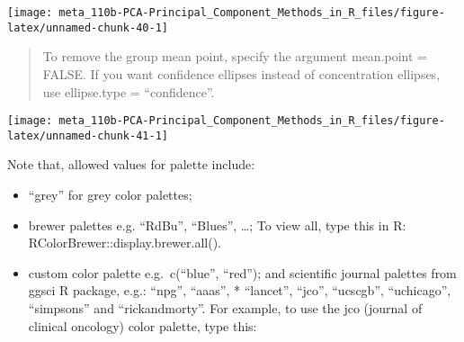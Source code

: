 \documentclass[]{book}
\newenvironment{Shaded}{\begin{snugshade}}{\end{snugshade}}
\newcommand{\CommentTok}[1]{\textcolor[rgb]{0.56,0.35,0.01}{\textit{#1}}}
\newcommand{\DataTypeTok}[1]{\textcolor[rgb]{0.13,0.29,0.53}{#1}}
\newcommand{\KeywordTok}[1]{\textcolor[rgb]{0.13,0.29,0.53}{\textbf{#1}}}
\newcommand{\NormalTok}[1]{#1}
\newcommand{\OperatorTok}[1]{\textcolor[rgb]{0.81,0.36,0.00}{\textbf{#1}}}
\newcommand{\OtherTok}[1]{\textcolor[rgb]{0.56,0.35,0.01}{#1}}
\newcommand{\StringTok}[1]{\textcolor[rgb]{0.31,0.60,0.02}{#1}}
\providecommand{\tightlist}{%
  \setlength{\itemsep}{0pt}\setlength{\parskip}{0pt}}
\begin{document}
\begin{center}\texttt{[image: meta\_110b-PCA-Principal\_Component\_Methods\_in\_R\_files/figure-latex/unnamed-chunk-40-1]} \end{center}

\begin{quote}
To remove the group mean point, specify the argument mean.point = FALSE.
If you want confidence ellipses instead of concentration ellipses, use ellipse.type = ``confidence''.
\end{quote}

\begin{Shaded}
\end{Shaded}

\begin{center}\texttt{[image: meta\_110b-PCA-Principal\_Component\_Methods\_in\_R\_files/figure-latex/unnamed-chunk-41-1]} \end{center}

Note that, allowed values for palette include:

\begin{itemize}
\tightlist
\item
  ``grey'' for grey color palettes;
\item
  brewer palettes e.g. ``RdBu'', ``Blues'', \ldots{}; To view all, type this in R: RColorBrewer::display.brewer.all().
\item
  custom color palette e.g.~c(``blue'', ``red'');
  and scientific journal palettes from ggsci R package, e.g.: ``npg'', ``aaas'', * ``lancet'', ``jco'', ``ucscgb'', ``uchicago'', ``simpsons'' and ``rickandmorty''.
  For example, to use the jco (journal of clinical oncology) color palette, type this:
\end{itemize}
\end{document}
